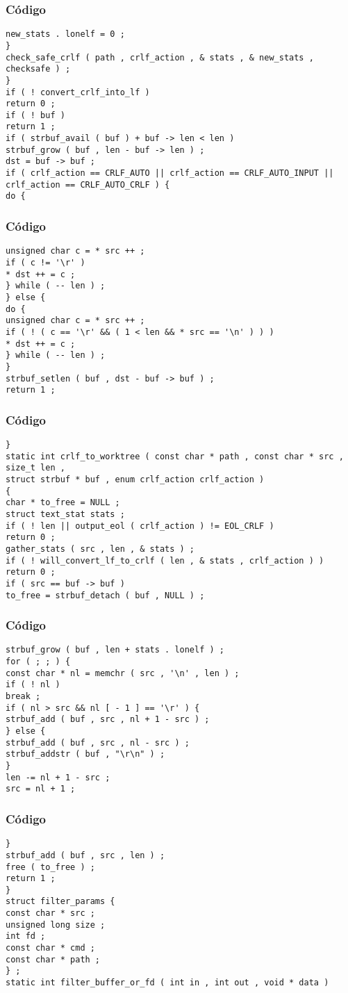 \documentclass{beamer}
\begin{document}
\begin{frame}[fragile]
\frametitle{C\'odigo}
\begin{verbatim}
new_stats . lonelf = 0 ; 
} 
check_safe_crlf ( path , crlf_action , & stats , & new_stats , checksafe ) ; 
} 
if ( ! convert_crlf_into_lf ) 
return 0 ; 
if ( ! buf ) 
return 1 ; 
if ( strbuf_avail ( buf ) + buf -> len < len ) 
strbuf_grow ( buf , len - buf -> len ) ; 
dst = buf -> buf ; 
if ( crlf_action == CRLF_AUTO || crlf_action == CRLF_AUTO_INPUT || crlf_action == CRLF_AUTO_CRLF ) { 
do { 
\end{verbatim}
\end{frame}
\begin{frame}[fragile]
\frametitle{C\'odigo}
\begin{verbatim}
unsigned char c = * src ++ ; 
if ( c != '\r' ) 
* dst ++ = c ; 
} while ( -- len ) ; 
} else { 
do { 
unsigned char c = * src ++ ; 
if ( ! ( c == '\r' && ( 1 < len && * src == '\n' ) ) ) 
* dst ++ = c ; 
} while ( -- len ) ; 
} 
strbuf_setlen ( buf , dst - buf -> buf ) ; 
return 1 ; 
\end{verbatim}
\end{frame}
\begin{frame}[fragile]
\frametitle{C\'odigo}
\begin{verbatim}
} 
static int crlf_to_worktree ( const char * path , const char * src , size_t len , 
struct strbuf * buf , enum crlf_action crlf_action ) 
{ 
char * to_free = NULL ; 
struct text_stat stats ; 
if ( ! len || output_eol ( crlf_action ) != EOL_CRLF ) 
return 0 ; 
gather_stats ( src , len , & stats ) ; 
if ( ! will_convert_lf_to_crlf ( len , & stats , crlf_action ) ) 
return 0 ; 
if ( src == buf -> buf ) 
to_free = strbuf_detach ( buf , NULL ) ; 
\end{verbatim}
\end{frame}
\begin{frame}[fragile]
\frametitle{C\'odigo}
\begin{verbatim}
strbuf_grow ( buf , len + stats . lonelf ) ; 
for ( ; ; ) { 
const char * nl = memchr ( src , '\n' , len ) ; 
if ( ! nl ) 
break ; 
if ( nl > src && nl [ - 1 ] == '\r' ) { 
strbuf_add ( buf , src , nl + 1 - src ) ; 
} else { 
strbuf_add ( buf , src , nl - src ) ; 
strbuf_addstr ( buf , "\r\n" ) ; 
} 
len -= nl + 1 - src ; 
src = nl + 1 ; 
\end{verbatim}
\end{frame}
\begin{frame}[fragile]
\frametitle{C\'odigo}
\begin{verbatim}
} 
strbuf_add ( buf , src , len ) ; 
free ( to_free ) ; 
return 1 ; 
} 
struct filter_params { 
const char * src ; 
unsigned long size ; 
int fd ; 
const char * cmd ; 
const char * path ; 
} ; 
static int filter_buffer_or_fd ( int in , int out , void * data ) 
\end{verbatim}
\end{frame}
\end{document}
